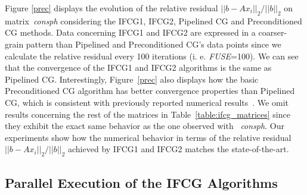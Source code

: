 Figure \ref{prec} displays the evolution of the relative residual $||b-Ax_{i}||_{2}/||b||_{2}$ on matrix~\emph{consph} considering the IFCG1, IFCG2, Pipe\-lined CG and Preconditioned CG methods.
Data concerning IFCG1 and IFCG2 are expressed in a coarser-grain pattern than Pipelined and Preconditioned CG's data points since we calculate the relative residual every 100 iterations (i. e. \emph{FUSE}=100).
We can see that the convergence of the IFCG1 and IFCG2 algorithms is the same as Pipelined CG.
Interestingly, Figure~\ref{prec} also displays how the basic Preconditioned CG algorithm has better convergence properties than Pipelined CG, which is consistent with previously reported numerical results~\cite{ghysels14, cools16}.
We omit results concerning the rest of the matrices in Table~\ref{table:ifcg_matrices} since they exhibit the exact same behavior as the one observed with ~\emph{consph}.
Our experiments show how the numerical behavior in terms of the relative residual $||b-Ax_{i}||_{2}/||b||_{2}$ achieved by IFCG1 and IFCG2 matches the state-of-the-art. 
\begin{table}[H]
\fontsize{9}{9}\selectfont
\centering
{}
\vspace{0.2cm}
\caption{Matrices used for experiments}
\label{table:ifcg_matrices}
\vspace{-0.5cm}
\end{table}

\subsection{Parallel Execution of the IFCG Algorithms}
\label{sec:ifcg_implementation}

